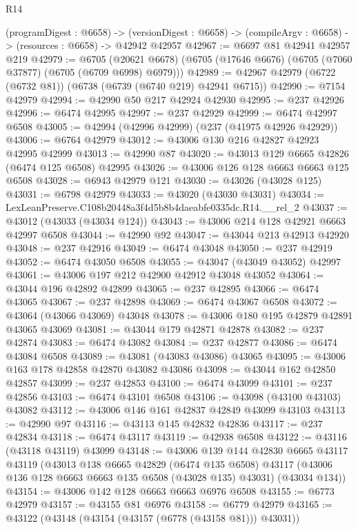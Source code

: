 \begin{lexlean}{R14}
\begin{coremodule}
  (programDigest : @6658) ->
  (versionDigest : @6658) -> (compileArgv : @6658) -> (resources : @6658) -> @42942 @42957
@42967 := @6697 @81 @42941 @42957 @219
@42979 := @6705
    (@20621 @6678)
    (@6705 (@17646 @6676) (@6705 (@7060 @37877) (@6705 (@6709 @6998) @6979)))
@42989 := @42967 @42979 (@6722 (@6732 @81)) (@6738 (@6739 (@6740 @219) @42941 @6715))
@42990 := @7154 @42979
@42994 := @42990 @50 @217 @42924 @42930
@42995 := @237 @42926
@42996 := @6474 @42995
@42997 := @237 @42929
@42999 := @6474 @42997 @6508
@43005 := @42994 (@42996 @42999) (@237 (@41975 @42926 @42929))
@43006 := @6764 @42979
@43012 := @43006 @130 @216 @42827 @42923 @42995 @42999
@43013 := @42990 @87
@43020 := @43013 @129 @6665 @42826 (@6474 @125 @6508) @42995
@43026 := @43006 @126 @128 @6663 @6663 @125 @6508
@43028 := @6943 @42979 @121
@43030 := @43026 (@43028 @125)
@43031 := @6798 @42979
@43033 := @43020 (@43030 @43031)
@43034 := LexLeanPreserve.C108b20448a3f4d5b8b4daeabfe0335dc.R14.__rel_2
@43037 := @43012 (@43033 (@43034 @124))
@43043 := @43006 @214 @128 @42921 @6663 @42997 @6508
@43044 := @42990 @92
@43047 := @43044 @213 @42913 @42920
@43048 := @237 @42916
@43049 := @6474 @43048
@43050 := @237 @42919
@43052 := @6474 @43050 @6508
@43055 := @43047 (@43049 @43052) @42997
@43061 := @43006 @197 @212 @42900 @42912 @43048 @43052
@43064 := @43044 @196 @42892 @42899
@43065 := @237 @42895
@43066 := @6474 @43065
@43067 := @237 @42898
@43069 := @6474 @43067 @6508
@43072 := @43064 (@43066 @43069) @43048
@43078 := @43006 @180 @195 @42879 @42891 @43065 @43069
@43081 := @43044 @179 @42871 @42878
@43082 := @237 @42874
@43083 := @6474 @43082
@43084 := @237 @42877
@43086 := @6474 @43084 @6508
@43089 := @43081 (@43083 @43086) @43065
@43095 := @43006 @163 @178 @42858 @42870 @43082 @43086
@43098 := @43044 @162 @42850 @42857
@43099 := @237 @42853
@43100 := @6474 @43099
@43101 := @237 @42856
@43103 := @6474 @43101 @6508
@43106 := @43098 (@43100 @43103) @43082
@43112 := @43006 @146 @161 @42837 @42849 @43099 @43103
@43113 := @42990 @97
@43116 := @43113 @145 @42832 @42836
@43117 := @237 @42834
@43118 := @6474 @43117
@43119 := @42938 @6508
@43122 := @43116 (@43118 @43119) @43099
@43148 := @43006
    @139
    @144
    @42830
    @6665
    @43117
    @43119
    (@43013
      @138
      @6665
      @42829
      (@6474 @135 @6508)
      @43117
      (@43006 @136 @128 @6663 @6663 @135 @6508 (@43028 @135) @43031)
      (@43034 @134))
@43154 := @43006 @142 @128 @6663 @6663 @6976 @6508
@43155 := @6773 @42979
@43157 := @43155 @81 @6976
@43158 := @6779 @42979
@43165 := @43122 (@43148 (@43154 (@43157 (@6778 (@43158 @81))) @43031))

\end{coremodule}
\end{lexlean}
